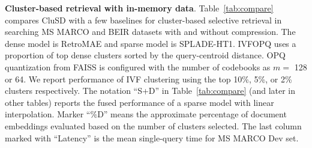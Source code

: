 {\bf Cluster-based retrieval with in-memory data}.
Table~\ref{tab:compare} compares CluSD with a few baselines for cluster-based selective retrieval 
in searching MS MARCO and BEIR datasets with and without compression.  
The dense model is RetroMAE and sparse model is SPLADE-HT1.
IVFOPQ uses a proportion of top dense clusters sorted by the query-centroid distance.
OPQ quantization from FAISS is configured with  the number of codebooks as $m=$ 128 or 64.
We report performance of IVF clustering using the top 10\%, 5\%, or 2\% clusters respectively.
The notation ``S+D'' in Table~\ref{tab:compare} (and later in other tables)
reports the fused performance of a sparse model 
with linear interpolation.
Marker  ``\%D'' means the approximate percentage of document embeddings  evaluated based on the number of clusters selected.
The last column marked with  ``Latency'' is the mean single-query time for MS MARCO Dev set.
